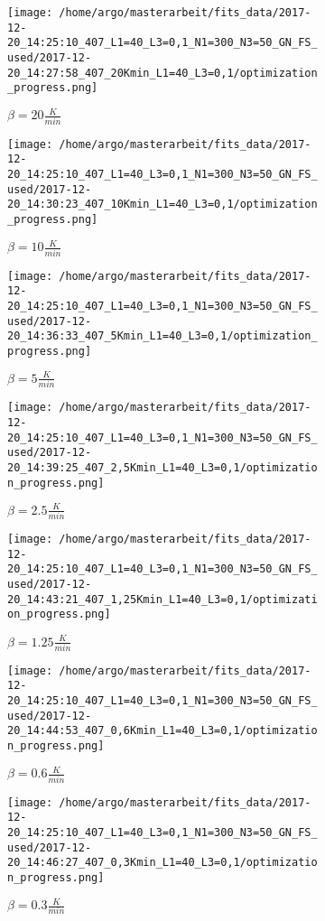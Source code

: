 \documentclass{scrartcl}[12pt, halfparskip]
\numberwithin{equation}{section}
\numberwithin{figure}{section}
\numberwithin{table}{section}
\begin{document}
\begin{figure}[H]
	\begin{subfigure}{0.49\textwidth}
		\texttt{[image: /home/argo/masterarbeit/fits\_data/2017-12-20\_14:25:10\_407\_L1=40\_L3=0,1\_N1=300\_N3=50\_GN\_FS\_used/2017-12-20\_14:27:58\_407\_20Kmin\_L1=40\_L3=0,1/optimization\_progress.png]}
		\caption{$\beta = 20 \frac{K}{min}$}
	\end{subfigure}
	\begin{subfigure}{0.49\textwidth}
		\texttt{[image: /home/argo/masterarbeit/fits\_data/2017-12-20\_14:25:10\_407\_L1=40\_L3=0,1\_N1=300\_N3=50\_GN\_FS\_used/2017-12-20\_14:30:23\_407\_10Kmin\_L1=40\_L3=0,1/optimization\_progress.png]}
		\caption{$\beta = 10 \frac{K}{min}$}
	\end{subfigure}
	\begin{subfigure}{0.49\textwidth}
		\texttt{[image: /home/argo/masterarbeit/fits\_data/2017-12-20\_14:25:10\_407\_L1=40\_L3=0,1\_N1=300\_N3=50\_GN\_FS\_used/2017-12-20\_14:36:33\_407\_5Kmin\_L1=40\_L3=0,1/optimization\_progress.png]}
		\caption{$\beta = 5 \frac{K}{min}$}
	\end{subfigure}
	\begin{subfigure}{0.49\textwidth}
		\texttt{[image: /home/argo/masterarbeit/fits\_data/2017-12-20\_14:25:10\_407\_L1=40\_L3=0,1\_N1=300\_N3=50\_GN\_FS\_used/2017-12-20\_14:39:25\_407\_2,5Kmin\_L1=40\_L3=0,1/optimization\_progress.png]}
		\caption{$\beta = 2.5 \frac{K}{min}$}
	\end{subfigure}
	\caption{}
	\label{fig:optimization_progress_FS_1}
\end{figure}

\begin{figure}[H]
	\begin{subfigure}{0.49\textwidth}
		\texttt{[image: /home/argo/masterarbeit/fits\_data/2017-12-20\_14:25:10\_407\_L1=40\_L3=0,1\_N1=300\_N3=50\_GN\_FS\_used/2017-12-20\_14:43:21\_407\_1,25Kmin\_L1=40\_L3=0,1/optimization\_progress.png]}
		\caption{$\beta = 1.25 \frac{K}{min}$}
	\end{subfigure}
	\begin{subfigure}{0.49\textwidth}
		\texttt{[image: /home/argo/masterarbeit/fits\_data/2017-12-20\_14:25:10\_407\_L1=40\_L3=0,1\_N1=300\_N3=50\_GN\_FS\_used/2017-12-20\_14:44:53\_407\_0,6Kmin\_L1=40\_L3=0,1/optimization\_progress.png]}
		\caption{$\beta = 0.6 \frac{K}{min}$}
	\end{subfigure}
	\centering
	\begin{subfigure}{0.49\textwidth}
		\texttt{[image: /home/argo/masterarbeit/fits\_data/2017-12-20\_14:25:10\_407\_L1=40\_L3=0,1\_N1=300\_N3=50\_GN\_FS\_used/2017-12-20\_14:46:27\_407\_0,3Kmin\_L1=40\_L3=0,1/optimization\_progress.png]}
		\caption{$\beta = 0.3 \frac{K}{min}$}
	\end{subfigure}

	\caption{}
	\label{fig:optimization_progress_FS_2}
\end{figure}
\end{document}
